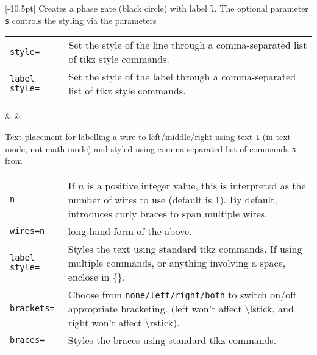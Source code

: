 \documentclass[aps,pra,10pt,nofootinbib]{revtex4-2}
\begin{document}
\begin{description}[style=nextline]
  \item [\textbackslash phase{[s]}\{l\}]\marginnote{\faToggleOn}[-10.5pt]
        Creates a phase gate (black circle) with label \texttt{l}. The optional parameter \texttt{s} controls the styling via the parameters

        \begin{tabular}{p{4cm}p{10cm}}
          \texttt{style=}       & Set the style of the line through a comma-separated list of tikz style commands.  \\
          \texttt{label style=} & Set the style of the label through a comma-separated list of tikz style commands.
        \end{tabular}

        \begin{Code}
          \begin{quantikz}
            & \phase{\alpha} &
          \end{quantikz}
        \end{Code}

  \item [\textbackslash lstick{[s]}\{t\}, \textbackslash midstick{[s]}\{t\}, \textbackslash rstick{[s]}\{t\}]
        Text placement for labelling a wire to left/middle/right using text \texttt{t} (in text mode, not math mode) and styled using comma separated list of commands \texttt{s} from

        \begin{tabular}{p{4cm}p{10cm}}
          \texttt{n}            & If $n$ is a positive integer value, this is interpreted as the number of wires to use (default is 1). By default, introduces curly braces to span multiple wires.           \\
          \texttt{wires=n}      & long-hand form of the above.                                                                                                                                                \\
          \texttt{label style=} & Styles the text using standard tikz commands. If using multiple commands, or anything involving a space, enclose in \{\}.                                                   \\
          \texttt{brackets=}    & Choose from \texttt{none/left/right/both} to switch on/off appropriate bracketing. (left won't affect \textbackslash lstick, and right won't affect \textbackslash rstick). \\
          \texttt{braces=}      & Styles the braces using standard tikz commands.
        \end{tabular}


\end{description}
\end{document}
